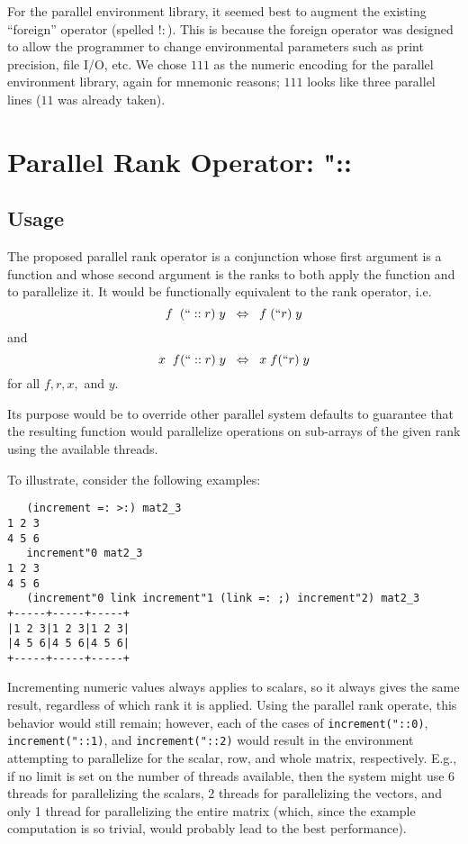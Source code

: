For the parallel environment library, 
it seemed best to augment the existing ``foreign'' operator (spelled $!:$).
This is because the foreign operator was designed to 
allow the programmer to change environmental parameters 
such as print precision, file I/O, etc. \cite{jvocab}
We chose $111$ as the numeric encoding for the parallel environment library, again for mnemonic reasons; 
$111$ looks like three parallel lines ($11$ was already taken).

\section{Parallel Rank Operator: \ttfamily"::\normalfont}
\label{prank}

\subsection{Usage}
The proposed parallel rank operator is a conjunction 
whose first argument is a function 
and whose second argument is the ranks to both apply the function and to parallelize it. 
It would be functionally equivalent to the rank operator, i.e. 
\[f\;\;(``::r)\;y\;\;\Leftrightarrow\;\;f\;(``r)\;y\] and \[x\;\;f(``::r)\;y\;\;\Leftrightarrow\;\;x\;f(``r)\;y\] for all $f, r, x,$ and $y$. %

Its purpose would be to override other parallel system defaults 
to guarantee that the resulting function would parallelize operations on sub-arrays of the given rank 
using the available threads.

To illustrate, consider the following examples:

\begin{singlespacing}
\begin{small}
\begin{verbatim}
   (increment =: >:) mat2_3
1 2 3
4 5 6
   increment"0 mat2_3
1 2 3
4 5 6
   (increment"0 link increment"1 (link =: ;) increment"2) mat2_3
+-----+-----+-----+
|1 2 3|1 2 3|1 2 3|
|4 5 6|4 5 6|4 5 6|
+-----+-----+-----+
\end{verbatim}
\end{small}
\end{singlespacing}

Incrementing numeric values always applies to scalars, so it always gives the same result, 
regardless of which rank it is applied. 
Using the parallel rank operate, this behavior would still remain; 
however, each of the cases of \texttt{increment("::0)}, \texttt{increment("::1)}, and \texttt{increment("::2)}
would result in the environment attempting to parallelize for the scalar, row, and whole matrix, respectively.
E.g., if no limit is set on the number of threads available, 
then the system might use 6 threads for parallelizing the scalars, 
2 threads for parallelizing the vectors, 
and only 1 thread for parallelizing the entire matrix 
(which, since the example computation is so trivial, would probably lead to the best performance).

